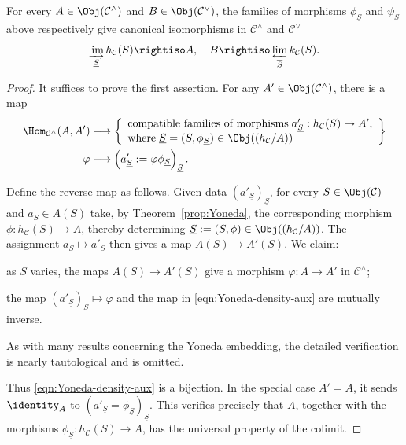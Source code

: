 \begin{theorem}[Density]\label{prop:Yoneda-density}
	For every $A\in\Obj(\mathcal{C}^\wedge)$ and $B\in\Obj(\mathcal{C}^\vee)$, the families of morphisms $\phi_{\underline S}$ and $\psi_{\overline S}$ above respectively give canonical isomorphisms in $\mathcal{C}^\wedge$ and $\mathcal{C}^\vee$
	\[ \varinjlim_{\underline{S}} h_{\mathcal{C}}(S) \rightiso A, \quad B \rightiso \varprojlim_{\overline{S}} k_{\mathcal{C}}(S). \]
\end{theorem}
\begin{proof}
	It suffices to prove the first assertion. For any $A'\in\Obj(\mathcal{C}^\wedge)$, there is a map
	\begin{equation}\label{eqn:Yoneda-density-aux} \begin{aligned}
		\Hom_{\mathcal{C}^\wedge}(A, A') & \longrightarrow \left\{\begin{array}{l}
			\text{compatible families of morphisms}\; a'_{\underline{S}}: h_{\mathcal{C}}(S) \to A' , \\
			\text{where}\; \underline{S} = (S, \phi_{\underline{S}}) \in \Obj((h_{\mathcal{C}}/A))
		\end{array}\right\} \\
		\varphi & \longmapsto \left( a'_{\underline{S}} := \varphi \phi_{\underline{S}}\right)_{\underline{S}} .
	\end{aligned}\end{equation}

	Define the reverse map as follows. Given data $(a'_{\underline S})_{\underline S}$, for every $S\in\Obj(\mathcal{C})$ and $a_S\in A(S)$ take, by Theorem~\ref{prop:Yoneda}, the corresponding morphism $\phi:h_{\mathcal{C}}(S)\to A$, thereby determining
	$\underline S:=(S,\phi)\in\Obj((h_{\mathcal{C}}/A))$. The assignment
	$a_S\mapsto a'_{\underline S}$ then gives a map $A(S)\to A'(S)$. We claim:
	\begin{compactitem}
		\item as $S$ varies, the maps $A(S)\to A'(S)$ give a morphism $\varphi:A\to A'$ in $\mathcal{C}^\wedge$;
		\item the map $(a'_{\underline S})_{\underline S}\mapsto\varphi$ and the map in \eqref{eqn:Yoneda-density-aux} are mutually inverse.
	\end{compactitem}
	As with many results concerning the Yoneda embedding, the detailed verification is nearly tautological and is omitted.

	Thus \eqref{eqn:Yoneda-density-aux} is a bijection. In the special case $A'=A$, it sends $\identity_A$ to
	$(a'_{\underline S}=\phi_{\underline S})_{\underline S}$. This verifies precisely that $A$, together with the morphisms
	$\phi_{\underline S}:h_{\mathcal{C}}(S)\to A$, has the universal property of the colimit.
\end{proof}

